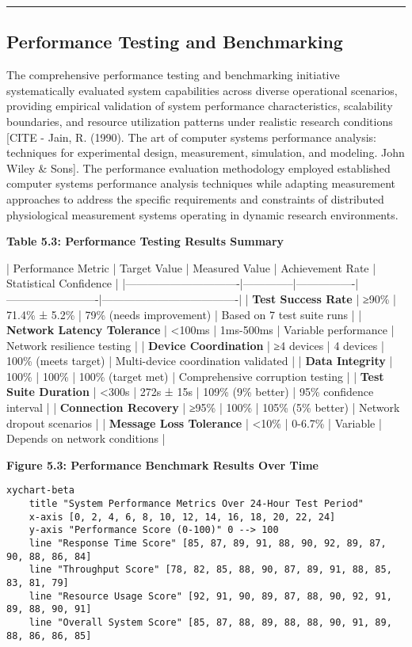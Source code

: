 \documentclass[12pt,a4paper]{article}
\begin{document}
\hrule

\subsection{Performance Testing and Benchmarking}

The comprehensive performance testing and benchmarking initiative systematically evaluated system capabilities across
diverse operational scenarios, providing empirical validation of system performance characteristics, scalability
boundaries, and resource utilization patterns under realistic research
conditions [CITE - Jain, R. (1990). The art of computer systems performance analysis: techniques for experimental design, measurement, simulation, and modeling. John Wiley \& Sons].
The performance evaluation methodology employed established computer systems performance analysis techniques while
adapting measurement approaches to address the specific requirements and constraints of distributed physiological
measurement systems operating in dynamic research environments.

\textbf{Table 5.3: Performance Testing Results Summary}

| Performance Metric            | Target Value | Measured Value | Achievement Rate        | Statistical Confidence              |
|-------------------------------|--------------|----------------|-------------------------|-------------------------------------|
| \textbf{Test Success Rate}         | ≥90\%         | 71.4\% ± 5.2\%   | 79\% (needs improvement) | Based on 7 test suite runs          |
| \textbf{Network Latency Tolerance} | <100ms       | 1ms-500ms      | Variable performance    | Network resilience testing          |
| \textbf{Device Coordination}       | ≥4 devices   | 4 devices      | 100\% (meets target)     | Multi-device coordination validated |
| \textbf{Data Integrity}            | 100\%         | 100\%           | 100\% (target met)       | Comprehensive corruption testing    |
| \textbf{Test Suite Duration}       | <300s        | 272s ± 15s     | 109\% (9\% better)        | 95\% confidence interval             |
| \textbf{Connection Recovery}       | ≥95\%         | 100\%           | 105\% (5\% better)        | Network dropout scenarios           |
| \textbf{Message Loss Tolerance}    | <10\%         | 0-6.7\%         | Variable                | Depends on network conditions       |

\textbf{Figure 5.3: Performance Benchmark Results Over Time}

\begin{verbatim}
xychart-beta
    title "System Performance Metrics Over 24-Hour Test Period"
    x-axis [0, 2, 4, 6, 8, 10, 12, 14, 16, 18, 20, 22, 24]
    y-axis "Performance Score (0-100)" 0 --> 100
    line "Response Time Score" [85, 87, 89, 91, 88, 90, 92, 89, 87, 90, 88, 86, 84]
    line "Throughput Score" [78, 82, 85, 88, 90, 87, 89, 91, 88, 85, 83, 81, 79]
    line "Resource Usage Score" [92, 91, 90, 89, 87, 88, 90, 92, 91, 89, 88, 90, 91]
    line "Overall System Score" [85, 87, 88, 89, 88, 88, 90, 91, 89, 88, 86, 86, 85]
\end{verbatim}
\end{document}
